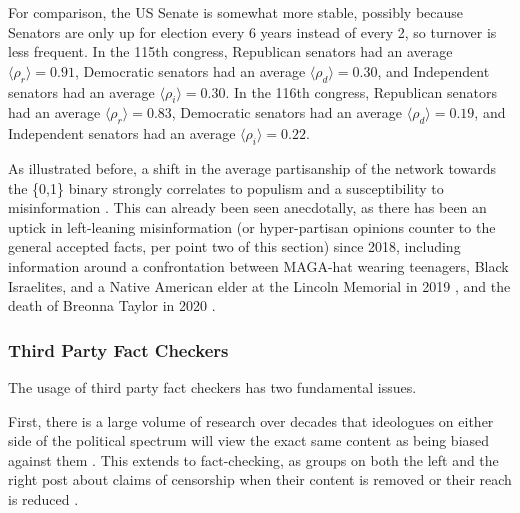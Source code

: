 \documentclass[preprint,review,12pt]{elsarticle}
\begin{document}
 For comparison, the US Senate is somewhat more stable, possibly because Senators are only up for election every 6 years instead of every 2, so turnover is less frequent. In the 115th congress, Republican senators had an average $\langle \rho_r \rangle = 0.91$, Democratic senators had an average $\langle \rho_d \rangle = 0.30$, and Independent senators had an average $\langle \rho_i \rangle = 0.30$. In the 116th congress, Republican senators had an average $\langle \rho_r \rangle = 0.83$, Democratic senators had an average $\langle \rho_d \rangle = 0.19$, and Independent senators had an average $\langle \rho_i \rangle = 0.22$.
 
 As illustrated before, a shift in the average partisanship of the network towards the \{0,1\} binary strongly correlates to populism and a susceptibility to misinformation \cite{hopp2020people,kahan2012ideology,mourao2019fake,shin2017partisan,swire2017processing,vargo2018agenda}. This can already been seen anecdotally, as there has been an uptick in left-leaning misinformation (or hyper-partisan opinions counter to the general accepted facts, per point two of this section)  since 2018, including information around a confrontation between MAGA-hat wearing teenagers, Black Israelites, and a Native American elder at the Lincoln Memorial in 2019 \cite{sacks2019maga,healy2019believing,pond2020complexity}, and the death of Breonna Taylor in 2020 \cite{duvall2020fact,kim2020fact}. 

 \subsubsection{Third Party Fact Checkers}
  \label{Third Party Fact Checkers Sections}
 The usage of third party fact checkers has two fundamental issues.
 
 First, there is a large volume of research over decades that ideologues on either side of the political spectrum will view the exact same content as being biased against them \cite{arpan2003experimental,baum2008eye,christen2002hostile,gunther2001predicting,gunther2004mapping,baum2004issue,gussin2004eye,lee2005liberal,vallone1985hostile}. This extends to fact-checking, as groups on both the left and the right post about claims of censorship when their content is removed or their reach is reduced \cite{Dreyfuss2020Now,Post2020Facebook,Millhiser2018Facebook}. 
 
\end{document}
